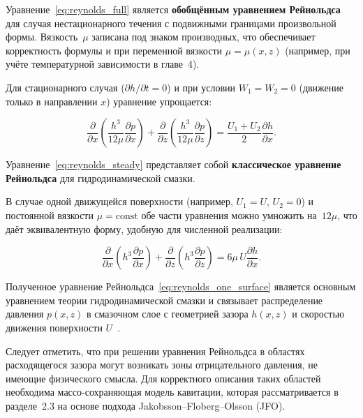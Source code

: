 Уравнение~\eqref{eq:reynolds_full} является \textbf{обобщённым уравнением Рейнольдса} для случая нестационарного течения с подвижными границами произвольной формы.
Вязкость~$\mu$ записана под знаком производных, что обеспечивает корректность формулы и при переменной вязкости $\mu = \mu(x, z)$ (например, при учёте температурной зависимости в главе~4).

Для стационарного случая ($\partial h/\partial t = 0$) и при условии $W_1 = W_2 = 0$ (движение только в направлении $x$) уравнение упрощается:

\begin{equation}
\frac{\partial}{\partial x}\left(\frac{h^3}{12\mu}\frac{\partial p}{\partial x}\right) + \frac{\partial}{\partial z}\left(\frac{h^3}{12\mu}\frac{\partial p}{\partial z}\right) = \frac{U_1 + U_2}{2}\frac{\partial h}{\partial x}.
\label{eq:reynolds_steady}
\end{equation}

Уравнение~\eqref{eq:reynolds_steady} представляет собой \textbf{классическое уравнение Рейнольдса} для гидродинамической смазки.

В случае одной движущейся поверхности (например, $U_1 = U$, $U_2 = 0$) и постоянной вязкости $\mu = \mathrm{const}$ обе части уравнения можно умножить на~$12\mu$, что даёт эквивалентную форму, удобную для численной реализации:

\begin{equation}
\frac{\partial}{\partial x}\left(h^3\frac{\partial p}{\partial x}\right) + \frac{\partial}{\partial z}\left(h^3\frac{\partial p}{\partial z}\right) = 6\mu\,U\frac{\partial h}{\partial x}.
\label{eq:reynolds_one_surface}
\end{equation}

Полученное уравнение Рейнольдса~\eqref{eq:reynolds_one_surface} является основным уравнением теории гидродинамической смазки и связывает распределение давления $p(x, z)$ в смазочном слое с геометрией зазора $h(x, z)$ и скоростью движения поверхности $U$~\cite{hori2002,szeri1998}.

Следует отметить, что при решении уравнения Рейнольдса в областях расходящегося зазора могут возникать зоны отрицательного давления, не имеющие физического смысла. Для корректного описания таких областей необходима массо-сохраняющая модель кавитации, которая рассматривается в разделе~2.3 на основе подхода Jakobsson--Floberg--Olsson (JFO).
